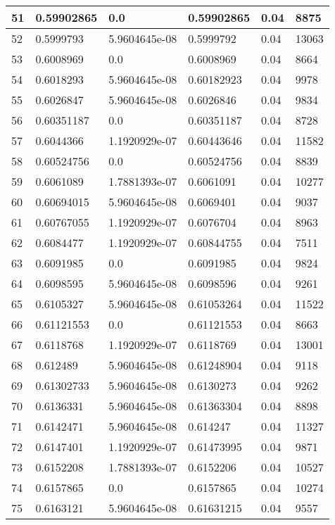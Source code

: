 \begin{longtable}{|l|l|l|l|l|l|}
51 & 0.59902865 & 0.0 & 0.59902865 & 0.04 & 8875 \\ \hline 
52 & 0.5999793 & 5.9604645e-08 & 0.5999792 & 0.04 & 13063 \\ \hline 
53 & 0.6008969 & 0.0 & 0.6008969 & 0.04 & 8664 \\ \hline 
54 & 0.6018293 & 5.9604645e-08 & 0.60182923 & 0.04 & 9978 \\ \hline 
55 & 0.6026847 & 5.9604645e-08 & 0.6026846 & 0.04 & 9834 \\ \hline 
56 & 0.60351187 & 0.0 & 0.60351187 & 0.04 & 8728 \\ \hline 
57 & 0.6044366 & 1.1920929e-07 & 0.60443646 & 0.04 & 11582 \\ \hline 
58 & 0.60524756 & 0.0 & 0.60524756 & 0.04 & 8839 \\ \hline 
59 & 0.6061089 & 1.7881393e-07 & 0.6061091 & 0.04 & 10277 \\ \hline 
60 & 0.60694015 & 5.9604645e-08 & 0.6069401 & 0.04 & 9037 \\ \hline 
61 & 0.60767055 & 1.1920929e-07 & 0.6076704 & 0.04 & 8963 \\ \hline 
62 & 0.6084477 & 1.1920929e-07 & 0.60844755 & 0.04 & 7511 \\ \hline 
63 & 0.6091985 & 0.0 & 0.6091985 & 0.04 & 9824 \\ \hline 
64 & 0.6098595 & 5.9604645e-08 & 0.6098596 & 0.04 & 9261 \\ \hline 
65 & 0.6105327 & 5.9604645e-08 & 0.61053264 & 0.04 & 11522 \\ \hline 
66 & 0.61121553 & 0.0 & 0.61121553 & 0.04 & 8663 \\ \hline 
67 & 0.6118768 & 1.1920929e-07 & 0.6118769 & 0.04 & 13001 \\ \hline 
68 & 0.612489 & 5.9604645e-08 & 0.61248904 & 0.04 & 9118 \\ \hline 
69 & 0.61302733 & 5.9604645e-08 & 0.6130273 & 0.04 & 9262 \\ \hline 
70 & 0.6136331 & 5.9604645e-08 & 0.61363304 & 0.04 & 8898 \\ \hline 
71 & 0.6142471 & 5.9604645e-08 & 0.614247 & 0.04 & 11327 \\ \hline 
72 & 0.6147401 & 1.1920929e-07 & 0.61473995 & 0.04 & 9871 \\ \hline 
73 & 0.6152208 & 1.7881393e-07 & 0.6152206 & 0.04 & 10527 \\ \hline 
74 & 0.6157865 & 0.0 & 0.6157865 & 0.04 & 10274 \\ \hline 
75 & 0.6163121 & 5.9604645e-08 & 0.61631215 & 0.04 & 9557 \\ \hline 
\end{longtable}